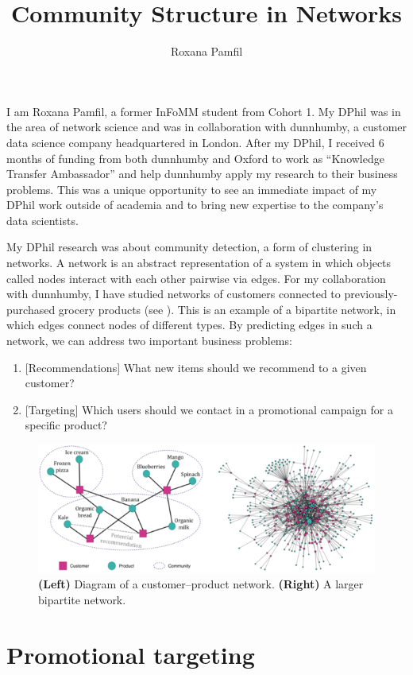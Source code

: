\documentclass[a4paper, 10pt, english, oneside]{extarticle}
\author{Roxana Pamfil} %
\title{Community Structure in Networks} %
\begin{document}
\maketitle %

I am Roxana Pamfil, a former InFoMM student from Cohort 1. My
DPhil was in the area of network science and was in collaboration
with dunnhumby, a customer data science company headquartered
in London. After my DPhil, I received 6 months of funding from both
dunnhumby and Oxford to work as ``Knowledge Transfer Ambassador''
and help dunnhumby apply my research to their business
problems. This was a unique opportunity to see an immediate impact
of my DPhil work outside of academia and to bring new expertise
to the company’s data scientists.

My DPhil research was about community detection, a form of clustering
in networks. A network is an abstract representation of a system
in which objects called nodes interact with each other pairwise
via edges. For my collaboration with dunnhumby, I have studied networks of customers connected
to previously-purchased grocery products (see ). This is an example of a bipartite network,
in which edges connect nodes of different types. By predicting edges in such a network, we can
address two important business problems:
\begin{enumerate}
\item {} [Recommendations] What new items should we recommend to a given customer?
\item {} [Targeting] Which users should we contact in a promotional campaign for a specific product?
\end{enumerate}


\begin{figure}
\includegraphics[width=0.7\linewidth]{network}
\caption{\textbf{(Left)} Diagram of a
customer–product
network.
\textbf{(Right)} A larger bipartite
network.}
\label{network}
\end{figure}

\section*{Promotional targeting}
\end{document}
